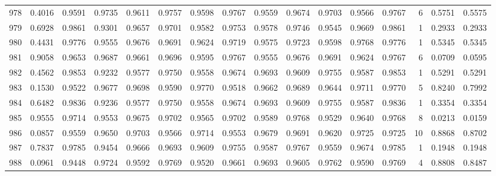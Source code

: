 \begin{tabular}{lrrrrrrrrrrrrrrr}
978 &      0.4016 &  0.9591 &  0.9735 &  0.9611 &  0.9757 &  0.9598 &  0.9767 &  0.9559 &  0.9674 &  0.9703 &   0.9566 &     0.9767 &      6 &                    0.5751 &                     0.5575 \\
979 &      0.6928 &  0.9861 &  0.9301 &  0.9657 &  0.9701 &  0.9582 &  0.9753 &  0.9578 &  0.9746 &  0.9545 &   0.9669 &     0.9861 &      1 &                    0.2933 &                     0.2933 \\
980 &      0.4431 &  0.9776 &  0.9555 &  0.9676 &  0.9691 &  0.9624 &  0.9719 &  0.9575 &  0.9723 &  0.9598 &   0.9768 &     0.9776 &      1 &                    0.5345 &                     0.5345 \\
981 &      0.9058 &  0.9653 &  0.9687 &  0.9661 &  0.9696 &  0.9595 &  0.9767 &  0.9555 &  0.9676 &  0.9691 &   0.9624 &     0.9767 &      6 &                    0.0709 &                     0.0595 \\
982 &      0.4562 &  0.9853 &  0.9232 &  0.9577 &  0.9750 &  0.9558 &  0.9674 &  0.9693 &  0.9609 &  0.9755 &   0.9587 &     0.9853 &      1 &                    0.5291 &                     0.5291 \\
983 &      0.1530 &  0.9522 &  0.9677 &  0.9698 &  0.9590 &  0.9770 &  0.9518 &  0.9662 &  0.9689 &  0.9644 &   0.9711 &     0.9770 &      5 &                    0.8240 &                     0.7992 \\
984 &      0.6482 &  0.9836 &  0.9236 &  0.9577 &  0.9750 &  0.9558 &  0.9674 &  0.9693 &  0.9609 &  0.9755 &   0.9587 &     0.9836 &      1 &                    0.3354 &                     0.3354 \\
985 &      0.9555 &  0.9714 &  0.9553 &  0.9675 &  0.9702 &  0.9565 &  0.9702 &  0.9589 &  0.9768 &  0.9529 &   0.9640 &     0.9768 &      8 &                    0.0213 &                     0.0159 \\
986 &      0.0857 &  0.9559 &  0.9650 &  0.9703 &  0.9566 &  0.9714 &  0.9553 &  0.9679 &  0.9691 &  0.9620 &   0.9725 &     0.9725 &     10 &                    0.8868 &                     0.8702 \\
987 &      0.7837 &  0.9785 &  0.9454 &  0.9666 &  0.9693 &  0.9609 &  0.9755 &  0.9587 &  0.9767 &  0.9559 &   0.9674 &     0.9785 &      1 &                    0.1948 &                     0.1948 \\
988 &      0.0961 &  0.9448 &  0.9724 &  0.9592 &  0.9769 &  0.9520 &  0.9661 &  0.9693 &  0.9605 &  0.9762 &   0.9590 &     0.9769 &      4 &                    0.8808 &                     0.8487 \\

\end{tabular}
